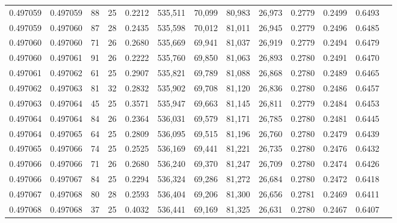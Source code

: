 \begin{tabular}{rrrrrrrrrrrrr}
0.497059 & 0.497059 &  88 &  25 &                                     0.2212 & 535,511 &  70,099 &  80,983 &  26,973 & 0.2779 & 0.2499 & 0.6493 \\
0.497059 & 0.497060 &  87 &  28 &                                     0.2435 & 535,598 &  70,012 &  81,011 &  26,945 & 0.2779 & 0.2496 & 0.6485 \\
0.497060 & 0.497060 &  71 &  26 &                                     0.2680 & 535,669 &  69,941 &  81,037 &  26,919 & 0.2779 & 0.2494 & 0.6479 \\
0.497060 & 0.497061 &  91 &  26 &                                     0.2222 & 535,760 &  69,850 &  81,063 &  26,893 & 0.2780 & 0.2491 & 0.6470 \\
0.497061 & 0.497062 &  61 &  25 &                                     0.2907 & 535,821 &  69,789 &  81,088 &  26,868 & 0.2780 & 0.2489 & 0.6465 \\
0.497062 & 0.497063 &  81 &  32 &                                     0.2832 & 535,902 &  69,708 &  81,120 &  26,836 & 0.2780 & 0.2486 & 0.6457 \\
0.497063 & 0.497064 &  45 &  25 &                                     0.3571 & 535,947 &  69,663 &  81,145 &  26,811 & 0.2779 & 0.2484 & 0.6453 \\
0.497064 & 0.497064 &  84 &  26 &                                     0.2364 & 536,031 &  69,579 &  81,171 &  26,785 & 0.2780 & 0.2481 & 0.6445 \\
0.497064 & 0.497065 &  64 &  25 &                                     0.2809 & 536,095 &  69,515 &  81,196 &  26,760 & 0.2780 & 0.2479 & 0.6439 \\
0.497065 & 0.497066 &  74 &  25 &                                     0.2525 & 536,169 &  69,441 &  81,221 &  26,735 & 0.2780 & 0.2476 & 0.6432 \\
0.497066 & 0.497066 &  71 &  26 &                                     0.2680 & 536,240 &  69,370 &  81,247 &  26,709 & 0.2780 & 0.2474 & 0.6426 \\
0.497066 & 0.497067 &  84 &  25 &                                     0.2294 & 536,324 &  69,286 &  81,272 &  26,684 & 0.2780 & 0.2472 & 0.6418 \\
0.497067 & 0.497068 &  80 &  28 &                                     0.2593 & 536,404 &  69,206 &  81,300 &  26,656 & 0.2781 & 0.2469 & 0.6411 \\
0.497068 & 0.497068 &  37 &  25 &                                     0.4032 & 536,441 &  69,169 &  81,325 &  26,631 & 0.2780 & 0.2467 & 0.6407 \\

\end{tabular}
